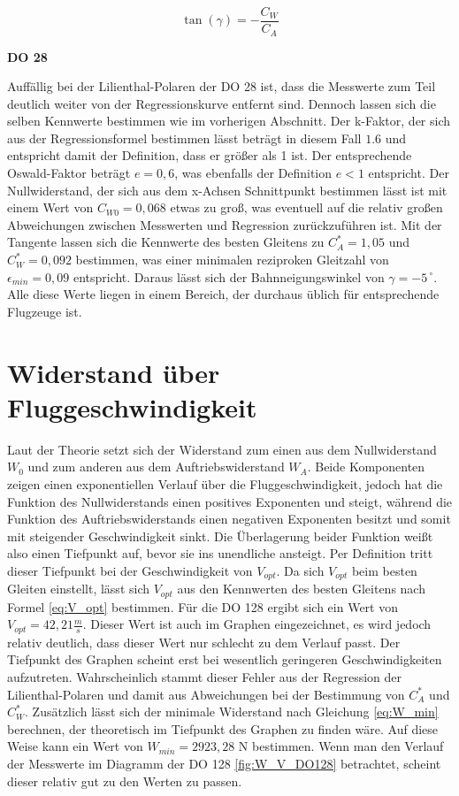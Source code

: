 \begin{equation}
\tan\left(\gamma\right)=-\frac{C_W}{C_A}
\label{Bahn}
\end{equation}

\textbf{DO 28}

Auffällig bei der Lilienthal-Polaren der DO 28 ist, dass die Messwerte zum Teil deutlich weiter von der Regressionskurve entfernt sind. Dennoch lassen sich die selben Kennwerte bestimmen wie im vorherigen Abschnitt. 
Der k-Faktor, der sich aus der Regressionsformel bestimmen lässt beträgt in diesem Fall $1.6$ und entspricht damit der Definition, dass er größer als 1 ist. Der entsprechende Oswald-Faktor beträgt $e = 0,6$, was ebenfalls der Definition $e<1$ entspricht. 
Der Nullwiderstand, der sich aus dem x-Achsen Schnittpunkt bestimmen lässt ist mit einem Wert von $C_{W0} = 0,068$ etwas zu groß, was eventuell auf die relativ großen Abweichungen zwischen Messwerten und Regression zurückzuführen ist.
Mit der Tangente lassen sich die Kennwerte des besten Gleitens zu $C_A^* = 1,05$ und $C_W^* = 0,092$ bestimmen, was einer minimalen reziproken Gleitzahl von $\epsilon_{min} = 0,09$ entspricht. Daraus lässt sich der Bahnneigungswinkel von $\gamma = -5^{\ \circ}$. Alle diese Werte liegen in einem Bereich, der durchaus üblich für entsprechende Flugzeuge ist.


\section{Widerstand über Fluggeschwindigkeit}
Laut der Theorie setzt sich der Widerstand zum einen aus dem Nullwiderstand $W_0$ und zum anderen aus dem Auftriebswiderstand $W_A$. Beide Komponenten zeigen einen exponentiellen Verlauf über die Fluggeschwindigkeit, jedoch hat die Funktion des Nullwiderstands einen positives Exponenten und steigt, während die Funktion des Auftriebswiderstands einen negativen Exponenten besitzt und somit mit steigender Geschwindigkeit sinkt. Die Überlagerung beider Funktion weißt also einen Tiefpunkt auf, bevor sie ins unendliche ansteigt. Per Definition tritt dieser Tiefpunkt bei der Geschwindigkeit von $V_{opt}$. Da sich $V_{opt}$ beim besten Gleiten einstellt, lässt sich $V_{opt}$ aus den Kennwerten des besten Gleitens nach Formel \ref{eq:V_opt} bestimmen. Für die DO 128 ergibt sich ein Wert von $V_{opt} = 42,21 \frac{m}{s}$. Dieser Wert ist auch im Graphen eingezeichnet, es wird jedoch relativ deutlich, dass dieser Wert nur schlecht zu dem Verlauf passt. Der Tiefpunkt des Graphen scheint erst bei wesentlich geringeren Geschwindigkeiten aufzutreten. Wahrscheinlich stammt dieser Fehler aus der Regression der Lilienthal-Polaren und damit aus Abweichungen bei der Bestimmung von $C_A^*$ und $C_W^*$. Zusätzlich lässt sich der minimale Widerstand nach Gleichung \ref{eq:W_min} berechnen, der theoretisch im Tiefpunkt des Graphen zu finden wäre. Auf diese Weise kann ein Wert von $W_{min} = 2923,28$ N bestimmen. Wenn man den Verlauf der Messwerte im Diagramm der DO 128 \ref{fig:W_V_DO128} betrachtet, scheint dieser relativ gut zu den Werten zu passen.

